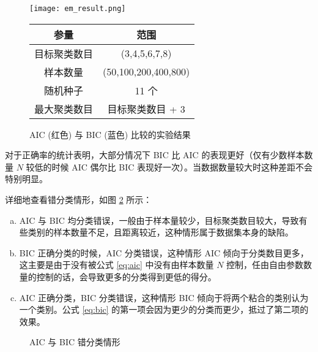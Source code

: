     \begin{figure}
        \begin{minipage}[b]{.5\linewidth}
            \centering
            \texttt{[image: em\_result.png]}
            \caption{AIC (红色) 与 BIC (蓝色) 比较的实验结果}\label{fig:em_result}
        \end{minipage}
        \begin{minipage}[b]{.5\linewidth}
            \centering
            \begin{tabular}{cc}
                \toprule
                参量 & 范围 \\
                \midrule
                目标聚类数目 & (3,4,5,6,7,8) \\
                样本数量 & (50,100,200,400,800) \\
                \midrule
                随机种子 & 11 个 \\
                最大聚类数目 & 目标聚类数目 + 3 \\
                \bottomrule
            \end{tabular}
            \label{tab:exparam}
        \end{minipage}
    \end{figure}

    对于正确率的统计表明，大部分情况下 BIC 比 AIC 的表现更好（仅有少数样本数量 $N$ 较低的时候 AIC 偶尔比 BIC 表现好一次）。当数据数量较大时这种差距不会特别明显。
    
    详细地查看错分类情形，如图 \ref{fig:false} 所示：
    \begin{enumerate}[(a)]
        \item AIC 与 BIC 均分类错误，一般由于样本量较少，目标聚类数目较大，导致有些类别的样本数量不足，且距离较近，这种情形属于数据集本身的缺陷。
        \item BIC 正确分类的时候，AIC 分类错误，这种情形 AIC 倾向于分类数目更多，这主要是由于没有被公式 \eqref{eq:aic} 中没有由样本数量 $N$ 控制，任由自由参数数量的控制的话，会导致更多的分类得到更低的得分。
        \item AIC 正确分类，BIC 分类错误，这种情形 BIC 倾向于将两个粘合的类别认为一个类别。公式 \eqref{eq:bic} 的第一项会因为更少的分类而更少，抵过了第二项的效果。
    \end{enumerate}

    \begin{figure}
        \centering
        \caption{AIC 与 BIC 错分类情形}\label{fig:false}
    \end{figure}
    
